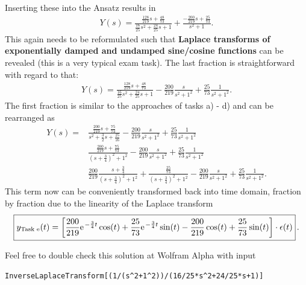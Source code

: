 \documentclass[11pt,a4paper,DIV=12]{scrartcl}
\begin{document}
%
Inserting these into the Ansatz results in
\begin{align}
Y(s) = \frac{\frac{128}{219} s +
\frac{48}{73}}{\frac{16}{25} s^2 +
\frac{24}{25} s + 1} +
\frac{-\frac{200}{219} s +
\frac{25}{73}}{s^2+1}.
\end{align}
This again needs to be reformulated such that \textbf{Laplace transforms of
exponentially damped and undamped sine/cosine functions}
can be revealed (this is a very typical exam task).
%
The last fraction is straightforward with regard to that:
\begin{align}
Y(s) = \frac{\frac{128}{219} s + \frac{48}{73}}{\frac{16}{25} s^2 + \frac{24}{25} s + 1}
-\frac{200}{219}\frac{s}{s^2+1^2}
+\frac{25}{73}\frac{1}{s^2+1^2}.
\end{align}
%
The first fraction is similar to the approaches of tasks a) - d) and can be
rearranged as
\begin{align}
Y(s) = &
\frac{\frac{200}{219} s + \frac{75}{73}}{s^2 + \frac{3}{2} s + \frac{25}{16}}
-\frac{200}{219}\frac{s}{s^2+1^2}
+\frac{25}{73}\frac{1}{s^2+1^2}\\
&
\frac{\frac{200}{219} s + \frac{75}{73}}{(s + \frac{3}{4})^2 + 1^2}
-\frac{200}{219}\frac{s}{s^2+1^2}
+\frac{25}{73}\frac{1}{s^2+1^2}\\
&
\frac{200}{219} \frac{s + \frac{3}{4}}{(s + \frac{3}{4})^2 + 1^2}+
\frac{\frac{25}{73}}{(s + \frac{3}{4})^2 + 1^2}
-\frac{200}{219}\frac{s}{s^2+1^2}
+\frac{25}{73}\frac{1}{s^2+1^2}.
\end{align}
This term now can be conveniently transformed back into time domain,
fraction by fraction due to the linearity of the Laplace transform
\begin{align}
\boxed{
  y_\text{Task e}(t) =
  \left[ \frac{200}{219} \e^{-\frac{3}{4} t} \cos(t) +
  \frac{25}{73} \e^{-\frac{3}{4} t} \sin(t) -
  \frac{200}{219} \cos(t) +
  \frac{25}{73} \sin(t) \right] \cdot \epsilon(t)}\,.
\end{align}

Feel free to double check this solution at Wolfram Alpha with input
\begin{verbatim}
InverseLaplaceTransform[(1/(s^2+1^2))/(16/25*s^2+24/25*s+1)]
\end{verbatim}



\end{document}
